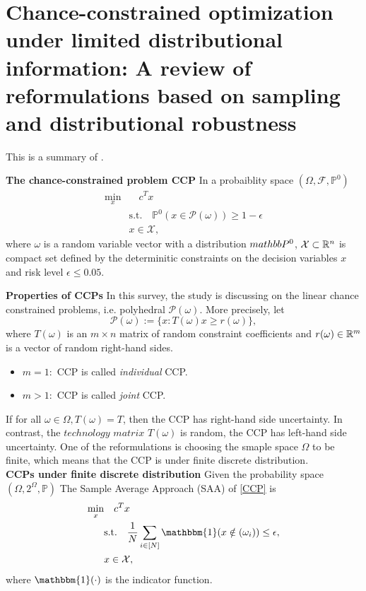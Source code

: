 \documentclass[11pt, oneside, reqno]{amsbook}
\begin{document}
\chapter{Chance-constrained optimization under limited distributional information: A review of reformulations based on sampling and distributional robustness}
This is a summary of \cite{kucukyavuza2022chance}.


\textbf{The chance-constrained problem CCP} In a probaiblity space $(\Omega, \mathcal{F}, \mathbb{P}^0)$
\begin{subequations} \label{CCP}
\begin{align}
  \min_x & \quad  c^T x \\
  & \text{s.t.} \quad \mathbb{P}^0 (x \in \mathcal{P} (\omega)) \ge 1 - \epsilon \\
  &  x \in \mathcal{X},
\end{align}
\end{subequations}
where $\omega$ is a random variable vector with a distribution $\\mathbb{P}^0$, $\mathcal{X} \subset \mathbb{R}^n$ is compact set defined by the determinitic constraints on the decision variables $x$ and risk level $\epsilon \le 0.05$.

\textbf{Properties of CCPs} In this survey, the study is discussing on the linear chance constrained problems, i.e. polyhedral $\mathcal{P}(\omega)$. 
More precisely, let 
\begin{equation}
  \mathcal{P}(\omega) := \{ x: T(\omega) x \ge r (\omega) \},
\end{equation}
where $T(\omega)$ is an $m \times n$ matrix  of random constraint coefficients and $r(\omega) \in \mathbb{R}^m$ is a vector of random right-hand sides.
\begin{itemize}
  \item $m=1:$ CCP is called \textit{individual} CCP.
  \item $m >1:$ CCP is called \textit{joint} CCP.
\end{itemize}
If for all $\omega \in \Omega, T(\omega) = T$, then the CCP has right-hand side uncertainty.
In contrast, the $technology$ $matrix$ $T(\omega)$ is random, the CCP has left-hand side uncertainty.
One of the reformulations is choosing the smaple space $\Omega$ to be finite, which means that the CCP is under finite discrete distribution.\\

\textbf{CCPs under finite discrete distribution} Given the probability space $(\Omega, 2^\Omega, \mathbb{P})$
The Sample Average Approach (SAA) of \eqref{CCP} is 
\begin{subequations} \label{CCP:SAA}
  \begin{align}
    \min_x & \quad  c^T x \\
    & \text{s.t.} \quad \frac{1}{N} \sum_{i \in [N]} \mathbbm{1} (x \notin \mathcal(\omega_i)) \le \epsilon, \\
    &  x \in \mathcal{X},
  \end{align}
  \end{subequations}
where $\mathbbm{1}(\cdot)$ is the indicator function.
\end{document}
